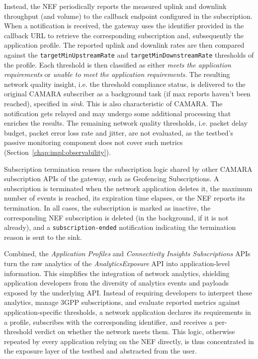 Instead, the \acs{NEF} periodically reports the measured uplink and downlink throughput (and volume) to the callback endpoint configured in the subscription. When a notification is received, the gateway uses the identifier provided in the callback \acs{URL} to retrieve the corresponding subscription and, subsequently the application profile. The reported uplink and downlink rates are then compared against the \texttt{targetMinUpstreamRate} and \texttt{targetMinDownstreamRate} thresholds of the profile. Each threshold is then classified as either \textit{meets the application requirements} or \textit{unable to meet the application requirements}. The resulting network quality insight, i.e. the threshold compliance status, is delivered to the original CAMARA subscriber as a background task (if max reports haven't been reached), specified in \textit{sink}. This is also characteristic of CAMARA. The notification gets relayed and may undergo some additional processing that enriches the results. The remaining network quality thresholds, i.e. packet delay budget, packet error loss rate and jitter, are not evaluated, as the testbed's passive monitoring component does not cover such metrics (Section~\ref{chap:impl:observability}).

Subscription termination reuses the subscription logic shared by other CAMARA subscription \acsp{API} of the gateway, such as Geofencing Subscriptions. A subscription is terminated when the network application deletes it, the maximum number of events is reached, its expiration time elapses, or the \acs{NEF} reports its termination. In all cases, the subscription is marked as inactive, the corresponding \acs{NEF} subscription is deleted (in the background, if it is not already), and a \texttt{subscription-ended} notification indicating the termination reason is sent to the sink.

Combined, the \textit{Application Profiles} and \textit{Connectivity Insights Subscriptions} \acsp{API} turn the raw analytics of the \textit{AnalyticsExposure} \acs{API} into application-level information. This simplifies the integration of network analytics, shielding application developers from the diversity of analytics events and payloads exposed by the underlying \acs{API}. Instead of requiring developers to interpret these analytics, manage \acs{3GPP} subscriptions, and evaluate reported metrics against application-specific thresholds, a network application declares its requirements in a profile, subscribes with the corresponding identifier, and receives a per-threshold verdict on whether the network meets them. This logic, otherwise repeated by every application relying on the \acs{NEF} directly, is thus concentrated in the exposure layer of the testbed and abstracted from the user.
